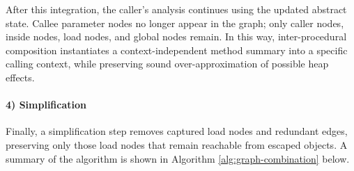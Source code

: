 \documentclass{article}
\begin{document}
\noindent After this integration, the caller’s analysis continues using the updated abstract state. 
Callee parameter nodes no longer appear in the graph; only caller nodes, inside nodes, load nodes, and global nodes remain. In this way, inter-procedural composition instantiates a context-independent method summary into a specific calling context, while preserving sound over-approximation of possible heap effects.

\paragraph{4) Simplification} Finally, a simplification step removes captured load nodes and redundant edges, preserving only those load nodes that remain reachable from escaped objects.
A summary of the algorithm is shown in Algorithm \ref{alg:graph-combination} below.













\end{document}
